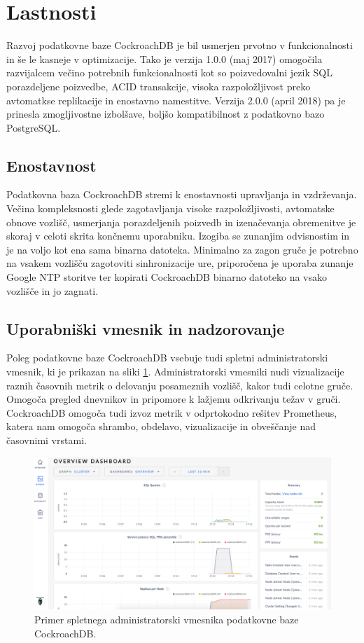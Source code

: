 \documentclass[a4paper, 12pt]{book}
\begin{document}
\section{Lastnosti}
Razvoj podatkovne baze CockroachDB je bil usmerjen prvotno v funkcionalnosti in še le kasneje v optimizacije. Tako je verzija 1.0.0 (maj 2017) omogočila razvijalcem večino potrebnih funkcionalnosti kot so poizvedovalni jezik SQL porazdeljene poizvedbe, ACID transakcije, visoka razpoložljivost preko avtomatkse replikacije in enostavno namestitve. Verzija 2.0.0 (april 2018) pa je prinesla zmogljivostne izbolšave, boljšo kompatibilnost z podatkovno bazo PostgreSQL.

\subsection{Enostavnost}
Podatkovna baza CockroachDB stremi k enostavnosti upravljanja in vzdr\-že\-van\-ja. Večina kompleksnosti glede zagotavljanja visoke razpoložljivosti, avtomatske obnove vozlišč, usmerjanja porazdeljenih poizvedb in izenačevanja obremenitve je skoraj v celoti skrita končnemu uporabniku. Izogiba se zunanjim odvisnostim in je na voljo kot ena sama binarna datoteka. Minimalno za zagon gruče je potrebno na vsakem vozlišču zagotoviti sinhronizacije ure, priporočena je uporaba zunanje Google NTP storitve ter kopirati CockroachDB binarno datoteko na vsako vozlišče in jo zagnati.

\subsection{Uporabniški vmesnik in nadzorovanje}
Poleg podatkovne baze CockroachDB vsebuje tudi spletni administratorski vmesnik, ki je prikazan na sliki \ref{img_crdb_admin_ui}. Administratorski vmesniki nudi vizualizacije raznih časovnih metrik o delovanju posameznih vozlišč, kakor tudi celotne gruče. Omogoča pregled dnevnikov in pripomore k lažjemu odkrivanju težav v gruči. CockroachDB omogoča tudi izvoz metrik v odprtokodno rešitev Prometheus, katera nam omogoča shrambo, obdelavo, vizualizacije in obveščanje nad časovnimi vrstami.

\begin{figure}[H]
\begin{center}
\includegraphics[width=1\textwidth]{resources/crdb_admin_ui.png}
\end{center}
\caption{Primer spletnega administratorski vmesnika podatkovne baze CockroachDB.}
\label{img_crdb_admin_ui}
\end{figure}
\end{document}
